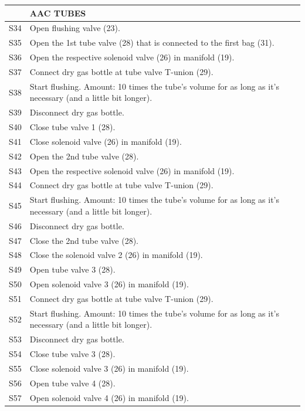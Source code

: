 \documentclass[a4paper,12pt,twoside]{article}
\begin{document}
\begin{appendices}
\begin{longtable} {|m{}|m{}|m{}|}
\hline
& \textbf{AAC TUBES} & \\
\hline
S34 & Open flushing valve (23). & \\
\hline
S35 & Open the 1st tube valve (28) that is connected to the first bag (31). & \\
\hline
S36 & Open the respective solenoid valve (26) in manifold (19). & \\
\hline
S37 & Connect dry gas bottle at tube valve T-union (29). & \\
\hline
S38 & Start flushing. Amount: 10 times the tube's volume for as long as it's necessary (and a little bit longer). & \\
\hline
S39 & Disconnect dry gas bottle. & \\
\hline
S40 & Close tube valve 1 (28). & \\
\hline
S41 & Close solenoid valve (26) in manifold (19). & \\
\hline
S42 & Open the 2nd tube valve (28). & \\
\hline
S43 & Open the respective solenoid valve (26) in manifold (19). & \\
\hline
S44 & Connect dry gas bottle at tube valve T-union (29). & \\
\hline
S45 & Start flushing. Amount: 10 times the tube's volume for as long as it's necessary (and a little bit longer). & \\
\hline
S46 & Disconnect dry gas bottle. & \\
\hline
S47 & Close the 2nd tube valve (28). & \\
\hline
S48 & Close the solenoid valve 2 (26) in manifold (19). & \\
\hline
S49 & Open tube valve 3 (28). & \\
\hline
S50 & Open solenoid valve 3 (26) in manifold (19). & \\
\hline
S51 & Connect dry gas bottle at tube valve T-union (29). & \\
\hline
S52 & Start flushing. Amount: 10 times the tube's volume for as long as it's necessary (and a little bit longer). & \\
\hline
S53 & Disconnect dry gas bottle. & \\
\hline
S54 & Close tube valve 3 (28). & \\
\hline
S55 & Close solenoid valve 3 (26) in manifold (19). & \\
\hline
S56 & Open tube valve 4 (28). & \\
\hline
S57 & Open solenoid valve 4 (26) in manifold (19). & \\

\end{longtable}
\end{appendices}
\end{document}
